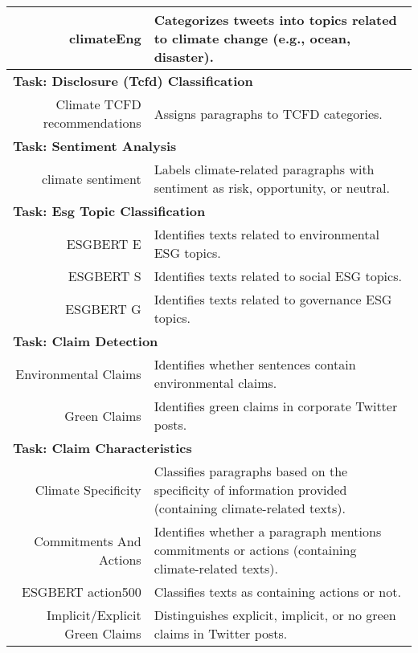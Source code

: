 \begin{table}[htbp]
\begin{tabular}{rp{10cm}}
\hline
climateEng \cite{vaid-etal-2022-towards} &  Categorizes tweets into topics related to climate change (e.g., ocean, disaster). \\
\hline
\multicolumn{2}{l}{\textbf{Task: Disclosure (Tcfd) Classification}} \\
\hline
Climate TCFD recommendations \cite{bingler2023cheaptalkspecificitysentiment} &  Assigns paragraphs to TCFD categories. \\ %
\hline
\multicolumn{2}{l}{\textbf{Task: Sentiment Analysis}} \\
\hline
climate sentiment \cite{bingler2023cheaptalkspecificitysentiment} &  Labels climate-related paragraphs with sentiment as risk, opportunity, or neutral. \\
\hline
\multicolumn{2}{l}{\textbf{Task: Esg Topic Classification}} \\
\hline
ESGBERT E \cite{schimanski_bridging_2023} &  Identifies texts related to environmental ESG topics. \\
\hline
ESGBERT S \cite{schimanski_bridging_2023} &  Identifies texts related to social ESG topics. \\
\hline
ESGBERT G \cite{schimanski_bridging_2023} &  Identifies texts related to governance ESG topics. \\
\hline
\multicolumn{2}{l}{\textbf{Task: Claim Detection}} \\
\hline
Environmental Claims \cite{stammbach_environmental_2023} &  Identifies whether sentences contain environmental claims. \\
\hline
Green Claims \cite{vinicius_woloszyn_towards_2021} &  Identifies green claims in corporate Twitter posts. \\
\hline
\multicolumn{2}{l}{\textbf{Task: Claim Characteristics}} \\
\hline
Climate Specificity \cite{bingler2023cheaptalkspecificitysentiment} &  Classifies paragraphs based on the specificity of information provided (containing climate-related texts). \\
\hline
Commitments And Actions \cite{bingler2023cheaptalkspecificitysentiment} &  Identifies whether a paragraph mentions commitments or actions (containing climate-related texts). \\
\hline
ESGBERT action500 \cite{schimanski_bridging_2023} &  Classifies texts as containing actions or not. \\
\hline
Implicit/Explicit Green Claims \cite{vinicius_woloszyn_towards_2021} &  Distinguishes explicit, implicit, or no green claims in Twitter posts. \\

\end{tabular}
\end{table}
